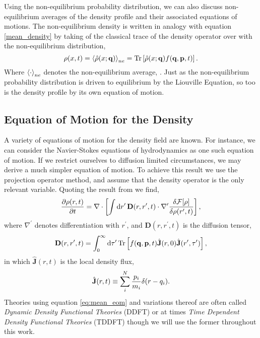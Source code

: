 Using the non-equilibrium probability distribution, we can also discuss
non-equilibrium averages of the density profile and their associated equations
of motions. The non-equilibrium density is written in analogy with equation
\ref{mean_density} by taking of the classical trace of the density operator
over with the non-equilibrium distribution,
%
\begin{equation}
    \rho(x, t) = \left\langle \hat{\rho}(x; \mathbf{q}) \right\rangle_{ne} =
        \mathrm{Tr}\left[ \hat{\rho}(x; \mathbf{q}) f(\mathbf{q}, \mathbf{p}, t) \right].
\end{equation}
%
Where $\left\langle \cdot \right\rangle_{ne}$ denotes the non-equilibrium average, . Just as the
non-equilibrium probability distribution is driven to equilibrium by the
Liouville Equation, so too is the density profile by its own equation of
motion.

\subsection{Equation of Motion for the Density} %

A variety of equations of motion for the density field are known.  For
instance, we can consider the Navier-Stokes equations of hydrodynamics as one
such equation of motion. If we restrict ourselves to diffusion limited
circumstances, we may derive a much simpler equation of motion. To achieve
this result we use the projection operator method, and assume that the 
density operator is the only relevant variable. Quoting the result from
\cite{ESPANOL09} we find,
%
\begin{equation}
    \label{eq:mean_eom}
    \frac{\partial \rho(r, t)}{\partial t} = 
        \nabla \cdot \left[\int \mathrm{d}r^\prime\, \mathbf{D}(r, r^\prime, t) 
        \cdot \nabla^\prime \frac{\delta \mathcal{F}[\rho]}{\delta \rho(r^\prime, t)}\right],
\end{equation}
%
where $\nabla^\prime$ denotes differentiation with $r^\prime$, and $\mathbf{D}(r, r^\prime, t)$ is the diffusion tensor,
%
\begin{equation}
    \mathbf{D}(r, r^\prime, t) = \int_0^\infty \mathrm{d}\tau^\prime\,
        \mathrm{Tr}\left[ f(\mathbf{q}, \mathbf{p}, t)\hat{\mathbf{J}}(r, 0)
        \hat{\mathbf{J}}(r^\prime, \tau^\prime) \right],
\end{equation}
%
 in which $\hat{\mathbf{J}}(r, t)$ is the local density flux,
%
\begin{equation}
    \hat{\mathbf{J}}(r, t) \equiv 
        \sum_i^N \frac{p_i}{m_i} \delta(r - q_i).
\end{equation}
%
Theories using equation \ref{eq:mean_eom} and variations thereof are often
called \textit{Dynamic Density Functional Theories} (DDFT) or at times
\textit{Time Dependent Density Functional Theories} (TDDFT) though we will use
the former throughout this work.

